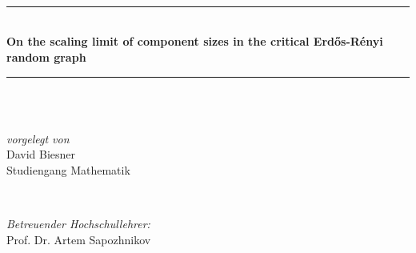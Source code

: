 \begin{titlepage}

\newcommand{\HRule}{\rule{\linewidth}{0.1mm}} %

\center %
 

\\[0.2cm] %
\\[0.2cm] %
\\[0.2cm] %


\HRule \\[0.4cm]
{ \huge \bfseries On the scaling limit of component sizes in the critical Erd\H os-Rényi random graph}\\[0.4cm] %
\HRule \\[1cm]

 

\\[2cm] %


\begin{minipage}{\textwidth}
\begin{flushleft} \large
\emph{vorgelegt von}\\
David Biesner \\
Studiengang Mathematik %
\end{flushleft}
\end{minipage}\\[1cm]

\begin{minipage}{\textwidth}
\begin{flushleft} \large
\emph{Betreuender Hochschullehrer:} \\
Prof. Dr. Artem Sapozhnikov %
\end{flushleft}
\end{minipage}\\[6cm]


\end{titlepage}

